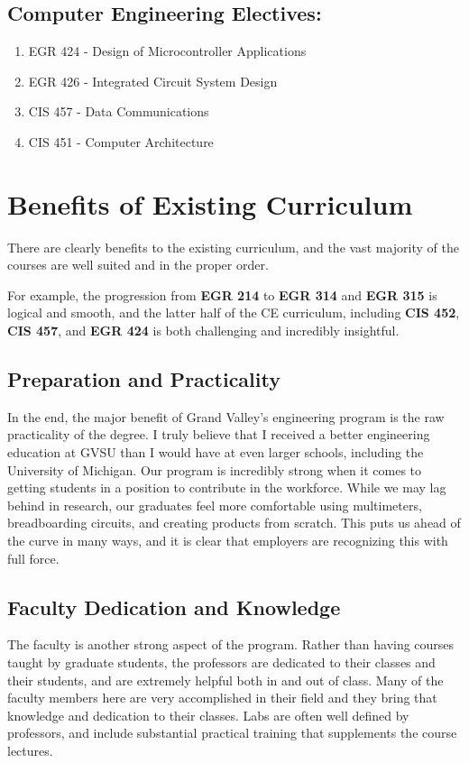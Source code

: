 \documentclass[12pt]{article}
\numberwithin{figure}{section}
\numberwithin{equation}{section}
\begin{document}
{\subsection{Computer Engineering
Electives:}\label{computer-engineering-electives}
\begin{enumerate}
\itemsep1pt\parskip0pt
\item EGR 424 - Design of Microcontroller Applications
\item EGR 426 - Integrated Circuit System Design
\item CIS 457 - Data Communications
\item CIS 451 - Computer Architecture
\end{enumerate}

\newpage
\section{Benefits of Existing Curriculum}\label{benefits}
There are clearly benefits to the existing curriculum, and the vast
majority of the courses are well suited and in the proper order.

\bigskip

For example, the progression from \textbf{EGR 214} to \textbf{EGR 314}
and \textbf{EGR 315} is logical and smooth, and the latter half of the
CE curriculum, including \textbf{CIS 452}, \textbf{CIS 457}, and
\textbf{EGR 424} is both challenging and incredibly insightful.

\subsection{Preparation and Practicality}\label{preparation-and-practicality}
In the end, the major benefit of Grand Valley's engineering program is
the raw practicality of the degree. I truly believe that I received a
better engineering education at GVSU than I would have at even larger
schools, including the University of Michigan. Our program is incredibly
strong when it comes to getting students in a position to contribute in
the workforce. While we may lag behind in research, our graduates feel
more comfortable using multimeters, breadboarding circuits, and creating
products from scratch. This puts us ahead of the curve in many ways, and
it is clear that employers are recognizing this with full force.

\subsection{Faculty Dedication and Knowledge}\label{faculty-dedication-and-knowledge}
The faculty is another strong aspect of the program. Rather than having
courses taught by graduate students, the professors are dedicated to
their classes and their students, and are extremely helpful both in and
out of class. Many of the faculty members here are very accomplished in
their field and they bring that knowledge and dedication to their
classes. Labs are often well defined by professors, and include
substantial practical training that supplements the course lectures.

}
\end{document}
